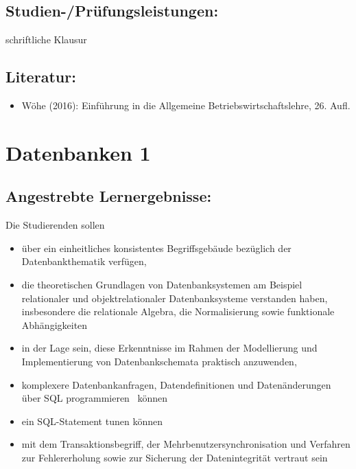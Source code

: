 \section*{Studien-/Prüfungsleistungen:}\label{studien-pruxfcfungsleistungen-3}

schriftliche Klausur

\section*{Literatur:}\label{literatur-4}

\begin{itemize}
\tightlist
\item
  Wöhe (2016): Einführung in die Allgemeine Betriebswirtschaftslehre,
  26. Aufl.
\end{itemize}

\chapter{Datenbanken 1}\label{datenbanken-1}

\section*{Angestrebte
Lernergebnisse:}\label{angestrebte-lernergebnisse-7}

Die Studierenden sollen

\begin{itemize}
\item
  über ein einheitliches konsistentes Begriffsgebäude bezüglich der
  Datenbankthematik verfügen,
\item
  die theoretischen Grundlagen von Datenbanksystemen am Beispiel
  relationaler und objektrelationaler Datenbanksysteme verstanden haben,
  insbesondere die relationale Algebra, die Normalisierung sowie
  funktionale Abhängigkeiten
\item
  in der Lage sein, diese Erkenntnisse im Rahmen der Modellierung und
  Implementierung von Datenbankschemata praktisch anzuwenden,
\item
  komplexere Datenbankanfragen, Datendefinitionen und Datenänderungen
  über SQL programmieren~ können
\item
  ein SQL-Statement tunen können
\item
  mit dem Transaktionsbegriff, der Mehrbenutzersynchronisation und
  Verfahren zur Fehlererholung sowie zur Sicherung der Datenintegrität
  vertraut sein
\end{itemize}

